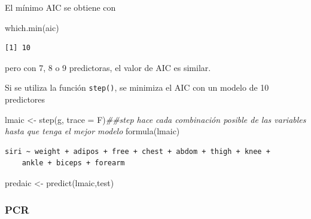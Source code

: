 \documentclass[
  letterpaper,
  DIV=11,
  numbers=noendperiod]{scrartcl}
\newenvironment{Shaded}{\begin{snugshade}}{\end{snugshade}}
\newcommand{\AttributeTok}[1]{\textcolor[rgb]{0.40,0.45,0.13}{#1}}
\newcommand{\DocumentationTok}[1]{\textcolor[rgb]{0.37,0.37,0.37}{\textit{#1}}}
\newcommand{\FunctionTok}[1]{\textcolor[rgb]{0.28,0.35,0.67}{#1}}
\newcommand{\NormalTok}[1]{\textcolor[rgb]{0.00,0.23,0.31}{#1}}
\newcommand{\OtherTok}[1]{\textcolor[rgb]{0.00,0.23,0.31}{#1}}
\newcommand{\SpecialCharTok}[1]{\textcolor[rgb]{0.37,0.37,0.37}{#1}}
\newcommand{\StringTok}[1]{\textcolor[rgb]{0.13,0.47,0.30}{#1}}
\begin{document}
El mínimo AIC se obtiene con

\begin{Shaded}
\begin{Highlighting}[]
\FunctionTok{which.min}\NormalTok{(aic)}
\end{Highlighting}
\end{Shaded}

\begin{verbatim}
[1] 10
\end{verbatim}

pero con 7, 8 o 9 predictoras, el valor de AIC es similar.

Si se utiliza la función \texttt{step()}, se minimiza el AIC con un
modelo de 10 predictores

\begin{Shaded}
\begin{Highlighting}[]
\NormalTok{lmaic }\OtherTok{\textless{}{-}} \FunctionTok{step}\NormalTok{(g, }\AttributeTok{trace =}\NormalTok{ F)}\DocumentationTok{\#\#step hace cada combinación posible de las variables hasta que tenga el mejor modelo }
\FunctionTok{formula}\NormalTok{(lmaic)}
\end{Highlighting}
\end{Shaded}

\begin{verbatim}
siri ~ weight + adipos + free + chest + abdom + thigh + knee + 
    ankle + biceps + forearm
\end{verbatim}

\begin{Shaded}
\begin{Highlighting}[]
\NormalTok{predaic }\OtherTok{\textless{}{-}} \FunctionTok{predict}\NormalTok{(lmaic,test)}
\end{Highlighting}
\end{Shaded}

\hypertarget{pcr}{%
\subsubsection{PCR}\label{pcr}}

\begin{Shaded}
\end{Shaded}
\end{document}
